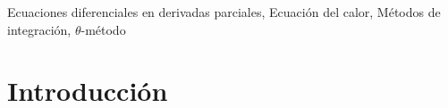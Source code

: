 \documentclass{endm}
\begin{document}
\begin{frontmatter}
\begin{abstract}

\end{abstract}

\begin{keyword}
Ecuaciones diferenciales en derivadas parciales, Ecuación del calor, Métodos de integración, $\theta$-método
\end{keyword}

\end{frontmatter}
{
\hypersetup{linkcolor=black}
\tableofcontents
}
\section{Introducci\'on}\label{intro}

\end{document}

